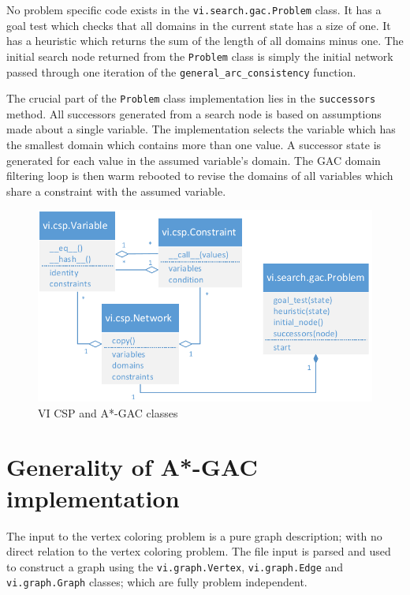 No problem specific code exists in the \texttt{vi.search.gac.Problem} class. It has a goal test which checks that all domains in the current state has a size of one. It has a heuristic which returns the sum of the length of all domains minus one. The initial search node returned from the \texttt{Problem} class is simply the initial network passed through one iteration of the \texttt{general\_arc\_consistency} function.

The crucial part of the \texttt{Problem} class implementation lies in the \texttt{successors} method. All successors generated from a search node is based on assumptions made about a single variable. The implementation selects the variable which has the smallest domain which contains more than one value. A successor state is generated for each value in the assumed variable's domain. The \ac{GAC} domain filtering loop is then warm rebooted to revise the domains of all variables which share a constraint with the assumed variable.

\begin{figure}[H]
\centering
\includegraphics[scale=0.7]{images/vi_astar_gac}
\caption{VI CSP and A*-GAC classes}
\label{figure:vi_astar_gac}
\end{figure}

\section*{Generality of A*-GAC implementation}

The input to the vertex coloring problem is a pure graph description; with no direct relation to the vertex coloring problem. The file input is parsed and used to construct a graph using the \texttt{vi.graph.Vertex}, \texttt{vi.graph.Edge} and \texttt{vi.graph.Graph} classes; which are fully problem independent.

